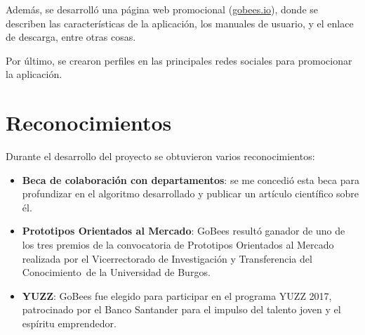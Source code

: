 Además, se desarrolló una página web promocional
(\href{http://gobees.io/}{gobees.io}), donde se describen las
características de la aplicación, los manuales de usuario, y el enlace
de descarga, entre otras cosas.

Por último, se crearon perfiles en las principales redes sociales para
promocionar la aplicación.

\section{Reconocimientos}\label{reconocimientos}

Durante el desarrollo del proyecto se obtuvieron varios reconocimientos:

\begin{itemize}
\tightlist
\item
  \textbf{Beca de colaboración con departamentos}: se me concedió esta
  beca para profundizar en el algoritmo desarrollado y publicar un
  artículo científico sobre él.
\item
  \textbf{Prototipos Orientados al Mercado}: GoBees resultó ganador de
  uno de los tres premios de la convocatoria de Prototipos Orientados al
  Mercado realizada por el Vicerrectorado de Investigación y
  Transferencia del Conocimiento~de la Universidad de Burgos.
\item
  \textbf{YUZZ}: GoBees fue elegido para participar en el programa YUZZ
  2017, patrocinado por el Banco Santander para el impulso del talento
  joven y el espíritu emprendedor.
\end{itemize}
